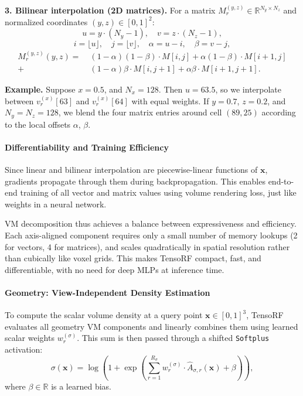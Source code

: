 \begin{enrichment}
\begin{enrichment}
    \smallskip
    \textbf{3. Bilinear interpolation (2D matrices).} For a matrix \( M^{(y,z)}_r \in \mathbb{R}^{N_y \times N_z} \) and normalized coordinates \( (y, z) \in [0,1]^2 \):
    \[
    u = y \cdot (N_y - 1), \quad v = z \cdot (N_z - 1),
    \]
    \[
    i = \lfloor u \rfloor, \quad j = \lfloor v \rfloor, \quad \alpha = u - i, \quad \beta = v - j,
    \]
    \[
    \begin{aligned}
        M^{(y,z)}_r(y,z) =\;
        & (1-\alpha)(1-\beta) \cdot M[i,j] + \alpha(1-\beta) \cdot M[i+1,j] \\
        +& (1-\alpha)\beta \cdot M[i,j+1] + \alpha\beta \cdot M[i+1,j+1].
    \end{aligned}
    \]
    
    \smallskip
    \textbf{Example.} Suppose \( x = 0.5 \), and \( N_x = 128 \). Then \( u = 63.5 \), so we interpolate between \( v_r^{(x)}[63] \) and \( v_r^{(x)}[64] \) with equal weights. If \( y = 0.7 \), \( z = 0.2 \), and \( N_y = N_z = 128 \), we blend the four matrix entries around cell \( (89, 25) \) according to the local offsets \( \alpha \), \( \beta \).
    
    \paragraph{Differentiability and Training Efficiency}
    
    Since linear and bilinear interpolation are piecewise-linear functions of \( \mathbf{x} \), gradients propagate through them during backpropagation. This enables end-to-end training of all vector and matrix values using volume rendering loss, just like weights in a neural network.
    
    \smallskip
    VM decomposition thus achieves a balance between expressiveness and efficiency. Each axis-aligned component requires only a small number of memory lookups (2 for vectors, 4 for matrices), and scales quadratically in spatial resolution rather than cubically like voxel grids. This makes TensoRF compact, fast, and differentiable, with no need for deep MLPs at inference time.
    
    \paragraph{Geometry: View-Independent Density Estimation}
    
    To compute the scalar volume density at a query point \( \mathbf{x} \in [0,1]^3 \), TensoRF evaluates all geometry VM components and linearly combines them using learned scalar weights \( w^{(\sigma)}_r \). This sum is then passed through a shifted \texttt{Softplus} activation:
    \[
    \sigma(\mathbf{x}) = \log\left(1 + \exp\left(\sum_{r=1}^{R_\sigma} w^{(\sigma)}_r \cdot \hat{A}_{\sigma,r}(\mathbf{x}) + \beta \right)\right),
    \]
    where \( \beta \in \mathbb{R} \) is a learned bias.
    

\end{enrichment}
\end{enrichment}
